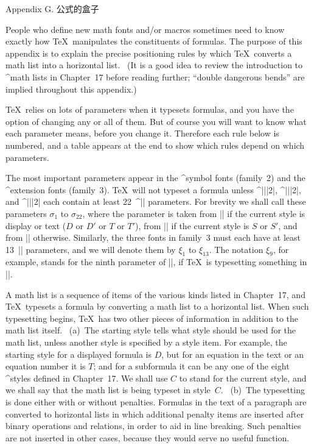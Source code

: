 


\beginappendix Appendix G. 公式的盒子

\ninepoint
People who define new math fonts and/or macros sometimes need to know
exactly how \TeX\ manipulates the constituents of formulas. The purpose
of this appendix is to explain the precise positioning rules by which
\TeX\ converts a math list into a horizontal list. \ (It is a good idea
to review the introduction to ^{math lists} in Chapter~17 before
reading further; ``double dangerous bends'' are implied throughout
this appendix.)

\TeX\ relies on lots of parameters when it typesets formulas, and you have
the option of changing any or all of them. But of course you will want to
know what each parameter means, before you change it. Therefore each rule
below is numbered, and a table appears at the end to show which rules
depend on which parameters.

The most important parameters appear in the ^{symbol fonts} (family~2) and
the ^{extension fonts} (family~3). \TeX\ will not typeset a formula unless
^|\textfont||2|, ^|\scriptfont||2|, and ^|\scriptscriptfont||2| each contain
at least 22~^|\fontdimen| parameters. For brevity we shall call these parameters
$\sigma_1$ to $\sigma_{22}$, where the parameter is taken from
|| if the current style is display or text ($D$ or $D'$ or $T$
or $T'$), from || if the current style is $S$ or $S'$, and from
|| otherwise. Similarly, the three fonts in family~3
must each have at least 13~|\fontdimen| parameters, and we will denote
them by $\xi_1$ to $\xi_{13}$. The notation $\xi_9$, for example, stands for
the ninth parameter of\/ ||, if \TeX\ is typesetting something
in |\scriptstyle|.

A math list is a sequence of items of the various kinds listed in Chapter~17,
and \TeX\ typesets a formula by converting a math list to a horizontal
list. When such typesetting begins, \TeX\ has two other pieces of
information in addition to the math list itself. \ (a)~The starting style
tells what style should be used for the math list, unless another style
is specified by a style item. For example, the starting style for a
displayed formula is $D$, but for an equation in the text or an equation
number it is $T$; and for a subformula it can be any one of the eight
^{styles} defined in Chapter~17. We shall use $C$ to stand for the current
style, and we shall say that the math list is being typeset in style~$C$.
\ (b)~The typesetting is done either with or without penalties. Formulas
in the text of a paragraph are converted to horizontal lists in which
additional penalty items are inserted after binary operations and relations,
in order to aid in line breaking. Such penalties are not inserted in
other cases, because they would serve no useful function.

